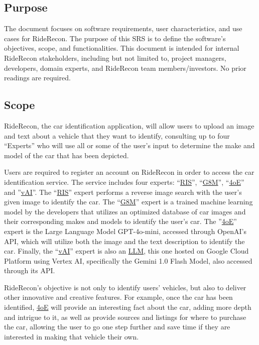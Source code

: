 \documentclass[]{article}
\begin{document}
\subsection{Purpose}
\label{sub:purpose}
The document focuses on software requirements, user characteristics, and use cases for RideRecon.
The purpose of this SRS is to define the software’s objectives, scope, and functionalities. This document is intended for internal RideRecon stakeholders, including but not limited to, project managers, developers, domain experts, and RideRecon team members/investors. No prior readings are required.

\subsection{Scope}
\label{sub:scope}

RideRecon, the car identification application, will allow users to upload an image and text about a vehicle that they want to identify, consulting up to four “Experts” who will use all or some of the user’s input to determine the make and model of the car that has been depicted.

Users are required to register an account on RideRecon in order to access the car identification service. The service includes four experts: “\underline{RIS}”, “\underline{G8M}”, “\underline{4oE}” and ”\underline{vAI}”. The “\underline{RIS}” expert performs a reverse image search with the user’s given image to identify the car. The “\underline{G8M}” expert is a trained machine learning model by the developers that utilizes an optimized database of car images and their corresponding makes and models to identify the user’s car. The ”\underline{4oE}” expert is the Large Language Model GPT-4o-mini, accessed through OpenAI’s API, which will utilize both the image and the text description to identify the car. Finally, the “\underline{vAI}” expert is also an \underline{LLM}, this one hosted on Google Cloud Platform using Vertex AI, specifically the Gemini 1.0 Flash Model, also accessed through its API.

RideRecon’s objective is not only to identify users’ vehicles, but also to deliver other innovative and creative features. For example, once the car has been identified, \underline{4oE} will provide an interesting fact about the car, adding more depth and intrigue to it, as well as provide sources and listings for where to purchase the car, allowing the user to go one step further and save time if they are interested in making that vehicle their own.
\end{document}
